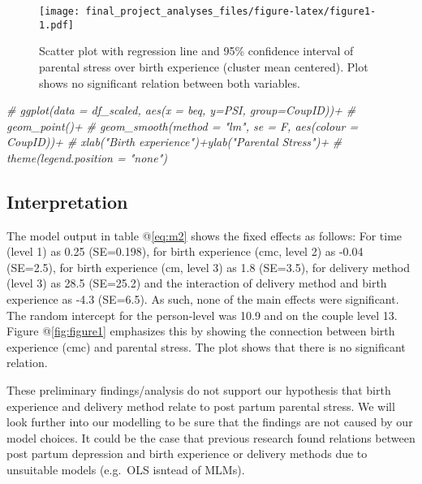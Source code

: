 \documentclass[
]{article}
\newenvironment{Shaded}{\begin{snugshade}}{\end{snugshade}}
\newcommand{\CommentTok}[1]{\textcolor[rgb]{0.56,0.35,0.01}{\textit{#1}}}
\begin{document}
\begin{figure}
\centering
\texttt{[image: final\_project\_analyses\_files/figure-latex/figure1-1.pdf]}
\caption{Scatter plot with regression line and 95\% confidence interval
of parental stress over birth experience (cluster mean centered). Plot
shows no significant relation between both variables.}
\end{figure}

\begin{Shaded}
\begin{Highlighting}[]
\CommentTok{\# ggplot(data = df\_scaled, aes(x = beq, y=PSI, group=CoupID))+}
\CommentTok{\#   geom\_point()+}
\CommentTok{\#   geom\_smooth(method = "lm", se = F, aes(colour = CoupID))+}
\CommentTok{\#   xlab("Birth experience")+ylab("Parental Stress")+}
\CommentTok{\#   theme(legend.position = "none")}
\end{Highlighting}
\end{Shaded}

\hypertarget{interpretation}{%
\subsection{Interpretation}\label{interpretation}}

The model output in table @\ref{eq:m2} shows the fixed effects as
follows: For time (level 1) as 0.25 (SE=0.198), for birth experience
(cmc, level 2) as -0.04 (SE=2.5), for birth experience (cm, level 3) as
1.8 (SE=3.5), for delivery method (level 3) as 28.5 (SE=25.2) and the
interaction of delivery method and birth experience as -4.3 (SE=6.5). As
such, none of the main effects were significant. The random intercept
for the person-level was 10.9 and on the couple level 13. Figure
@\ref{fig:figure1} emphasizes this by showing the connection between
birth experience (cmc) and parental stress. The plot shows that there is
no significant relation.

These preliminary findings/analysis do not support our hypothesis that
birth experience and delivery method relate to post partum parental
stress. We will look further into our modelling to be sure that the
findings are not caused by our model choices. It could be the case that
previous research found relations between post partum depression and
birth experience or delivery methods due to unsuitable models (e.g.~OLS
isntead of MLMs).
\end{document}

